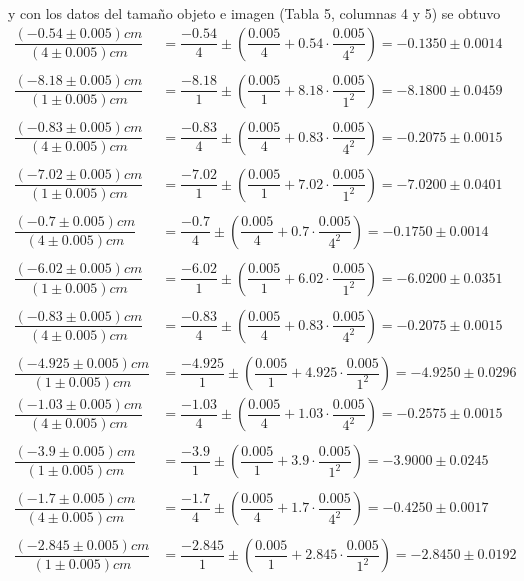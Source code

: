 \documentclass[10pt,a4paper]{article}
\begin{document}
	y con los datos del tamaño objeto e imagen (Tabla 5, columnas 4 y 5) se obtuvo  
	\begin{align*}
		\dfrac{(-0.54\pm0.005)cm}{(4\pm0.005)cm}&=\dfrac{-0.54}{4}\pm\left(\dfrac{0.005}{4}+0.54\cdot\dfrac{0.005}{4^2}\right)=-0.1350\pm0.0014\\\\
		\dfrac{(-8.18\pm0.005)cm}{(1\pm0.005)cm}&=\dfrac{-8.18}{1}\pm\left(\dfrac{0.005}{1}+8.18\cdot\dfrac{0.005}{1^2}\right)=-8.1800\pm0.0459\\\\
		\dfrac{(-0.83\pm0.005)cm}{(4\pm0.005)cm}&=\dfrac{-0.83}{4}\pm\left(\dfrac{0.005}{4}+0.83\cdot\dfrac{0.005}{4^2}\right)=-0.2075\pm0.0015\\\\
		\dfrac{(-7.02\pm0.005)cm}{(1\pm0.005)cm}&=\dfrac{-7.02}{1}\pm\left(\dfrac{0.005}{1}+7.02\cdot\dfrac{0.005}{1^2}\right)=-7.0200\pm0.0401\\\\
		\dfrac{(-0.7\pm0.005)cm}{(4\pm0.005)cm}&=\dfrac{-0.7}{4}\pm\left(\dfrac{0.005}{4}+0.7\cdot\dfrac{0.005}{4^2}\right)=-0.1750\pm0.0014\\\\
		\dfrac{(-6.02\pm0.005)cm}{(1\pm0.005)cm}&=\dfrac{-6.02}{1}\pm\left(\dfrac{0.005}{1}+6.02\cdot\dfrac{0.005}{1^2}\right)=-6.0200\pm0.0351\\\\
		\dfrac{(-0.83\pm0.005)cm}{(4\pm0.005)cm}&=\dfrac{-0.83}{4}\pm\left(\dfrac{0.005}{4}+0.83\cdot\dfrac{0.005}{4^2}\right)=-0.2075\pm0.0015\\\\
		\dfrac{(-4.925\pm0.005)cm}{(1\pm0.005)cm}&=\dfrac{-4.925}{1}\pm\left(\dfrac{0.005}{1}+4.925\cdot\dfrac{0.005}{1^2}\right)=-4.9250\pm0.0296
	\end{align*}
	\begin{align*}
		\dfrac{(-1.03\pm0.005)cm}{(4\pm0.005)cm}&=\dfrac{-1.03}{4}\pm\left(\dfrac{0.005}{4}+1.03\cdot\dfrac{0.005}{4^2}\right)=-0.2575\pm0.0015\\\\
		\dfrac{(-3.9\pm0.005)cm}{(1\pm0.005)cm}&=\dfrac{-3.9}{1}\pm\left(\dfrac{0.005}{1}+3.9\cdot\dfrac{0.005}{1^2}\right)=-3.9000\pm0.0245\\\\
		\dfrac{(-1.7\pm0.005)cm}{(4\pm0.005)cm}&=\dfrac{-1.7}{4}\pm\left(\dfrac{0.005}{4}+1.7\cdot\dfrac{0.005}{4^2}\right)=-0.4250\pm0.0017\\\\
		\dfrac{(-2.845\pm0.005)cm}{(1\pm0.005)cm}&=\dfrac{-2.845}{1}\pm\left(\dfrac{0.005}{1}+2.845\cdot\dfrac{0.005}{1^2}\right)=-2.8450\pm0.0192
	\end{align*}
\end{document}

